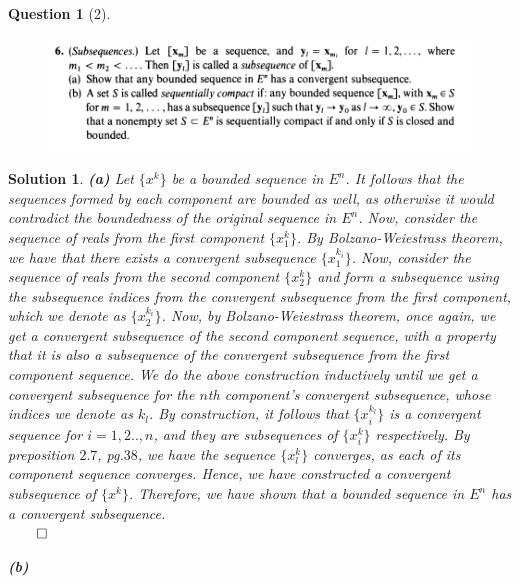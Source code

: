 \documentclass{article} %
\theoremstyle{quest}
\newtheorem*{question}{Question}
\newtheorem*{solution}{Solution}
\begin{document}
\begin{question}[2]
\hfill
\begin{figure}[h!]
  \centering
    \includegraphics[width=1\textwidth]{MA-2-24-6.png}
\end{figure}
\end{question}
\begin{solution}
\textbf{(a)}
Let $\{ x^k \}$ be a bounded sequence in $E^n$. It follows that the sequences formed
by each component are bounded as well, as otherwise it would contradict the boundedness
of the original sequence in $E^n$. Now, consider the sequence of reals 
from the first component $\{x^k_{1}\}$. By Bolzano-Weiestrass theorem, we have that
there exists a convergent subsequence $\{x^{k_i}_{1}\}$. Now, consider the sequence of
reals from the second component $\{x^k_{2}\}$ and form a subsequence using the
subsequence indices from the convergent subsequence from the first component, which 
we denote as $\{ x^{k_i}_{2}\}$. Now, by Bolzano-Weiestrass theorem, once again,
we get a convergent subsequence of the second component sequence, with a property
that it is also a subsequence of the convergent subsequence from the first component sequence.
We do the above construction inductively until we get a convergent subsequence for the
$n$th component's convergent subsequence, whose indices we denote as $k_l$.
By construction, it follows that $\{x^{k_l}_i\}$ is a convergent sequence for $i = 1,2..,n$,
and they are subsequences of $\{x^k_i\}$ respectively. By preposition $2.7$, pg.$38$, we have
the sequence $\{ x^k_l\}$ converges, as each of its component sequence converges. Hence, we have
constructed a convergent subsequence of $\{x^k\}$. Therefore, we have shown that 
a bounded sequence in $E^n$ has a convergent subsequence. \\ 
\hfill $\qed$
 
\bigskip

\textbf{(b)}


\end{solution}

\newpage
\end{document}
